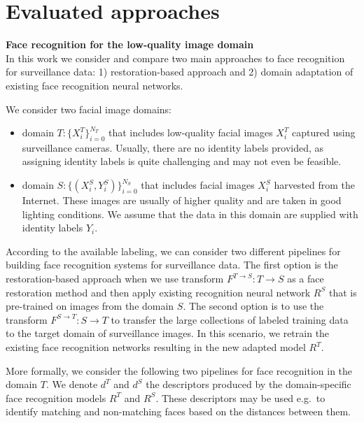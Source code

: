 \section{Evaluated approaches}
\label{sect:method}
\bigskip
\indent\textbf{Face recognition for the low-quality image domain}\\
\label{sect:strategies}
In this work we consider and compare two main approaches to face recognition for surveillance data: 1) restoration-based approach and 2) domain adaptation of existing face recognition neural networks. 

We consider two facial image domains: \begin{itemize}
\item domain $T: \{X^{T}_{i} \}_{i=0}^{N_T}$ that includes low-quality facial images $X^{T}_{i}$ captured using surveillance cameras. Usually, there are no identity labels provided, as assigning identity labels is quite challenging and may not even be feasible.
\item domain $S: \{(X^{S}_{i}, Y^{S}_{i})\}_{i=0}^{N_S}$ that includes facial images $X^{S}_{i}$ harvested from the Internet. These images are usually of higher quality and are taken in good lighting conditions. We assume that the data in this domain are supplied with identity labels $Y_i$.
\end{itemize}  

According to the available labeling, we can consider two different pipelines for building face recognition systems for surveillance data. The first option is the restoration-based approach when we use transform $F^{T \rightarrow S}: T \longrightarrow S$ as a face restoration method and then apply existing recognition neural network $R^{S}$ that is pre-trained on images from the domain $S$. The second option is to use the transform $F^{S \rightarrow T}: S \longrightarrow T$ to transfer the large collections of labeled training data to the target domain of surveillance images. In this scenario, we retrain the existing face recognition networks resulting in the new adapted model $R^{T}$.

More formally, we consider the following two pipelines for face recognition in the domain $T$.  We denote $d^{T}$ and $d^{S}$ the descriptors produced by the domain-specific face recognition models $R^{T}$ and $R^{S}$. These descriptors may be used e.g.\ to identify matching and non-matching faces based on the distances between them. 
 
